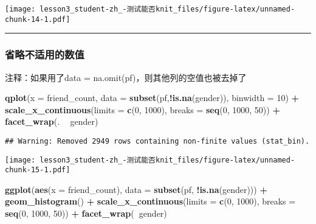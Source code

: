 \documentclass[]{article}
\newenvironment{Shaded}{\begin{snugshade}}{\end{snugshade}}
\newcommand{\DataTypeTok}[1]{\textcolor[rgb]{0.13,0.29,0.53}{#1}}
\newcommand{\DecValTok}[1]{\textcolor[rgb]{0.00,0.00,0.81}{#1}}
\newcommand{\KeywordTok}[1]{\textcolor[rgb]{0.13,0.29,0.53}{\textbf{#1}}}
\newcommand{\NormalTok}[1]{#1}
\newcommand{\OperatorTok}[1]{\textcolor[rgb]{0.81,0.36,0.00}{\textbf{#1}}}
\newcommand{\StringTok}[1]{\textcolor[rgb]{0.31,0.60,0.02}{#1}}
\begin{document}
\texttt{[image: lesson3\_student-zh\_-测试能否knit\_files/figure-latex/unnamed-chunk-14-1.pdf]}

\begin{center}\rule{0.5\linewidth}{\linethickness}\end{center}

\subsubsection{省略不适用的数值}

注释：如果用了data = na.omit(pf)，则其他列的空值也被去掉了

\begin{Shaded}
\begin{Highlighting}[]
\KeywordTok{qplot}\NormalTok{(}\DataTypeTok{x =}\NormalTok{ friend_count, }\DataTypeTok{data =} \KeywordTok{subset}\NormalTok{(pf,}\OperatorTok{!}\KeywordTok{is.na}\NormalTok{(gender)), }\DataTypeTok{binwidth =} \DecValTok{10}\NormalTok{) }\OperatorTok{+}
\StringTok{  }\KeywordTok{scale_x_continuous}\NormalTok{(}\DataTypeTok{limits =} \KeywordTok{c}\NormalTok{(}\DecValTok{0}\NormalTok{, }\DecValTok{1000}\NormalTok{), }\DataTypeTok{breaks =} \KeywordTok{seq}\NormalTok{(}\DecValTok{0}\NormalTok{, }\DecValTok{1000}\NormalTok{, }\DecValTok{50}\NormalTok{)) }\OperatorTok{+}
\StringTok{  }\KeywordTok{facet_wrap}\NormalTok{(. }\OperatorTok{~}\StringTok{ }\NormalTok{gender) }
\end{Highlighting}
\end{Shaded}

\begin{verbatim}
## Warning: Removed 2949 rows containing non-finite values (stat_bin).
\end{verbatim}

\texttt{[image: lesson3\_student-zh\_-测试能否knit\_files/figure-latex/unnamed-chunk-15-1.pdf]}

\begin{Shaded}
\begin{Highlighting}[]
\KeywordTok{ggplot}\NormalTok{(}\KeywordTok{aes}\NormalTok{(}\DataTypeTok{x =}\NormalTok{ friend_count), }\DataTypeTok{data =} \KeywordTok{subset}\NormalTok{(pf, }\OperatorTok{!}\KeywordTok{is.na}\NormalTok{(gender))) }\OperatorTok{+}\StringTok{ }
\StringTok{  }\KeywordTok{geom_histogram}\NormalTok{() }\OperatorTok{+}\StringTok{ }
\StringTok{  }\KeywordTok{scale_x_continuous}\NormalTok{(}\DataTypeTok{limits =} \KeywordTok{c}\NormalTok{(}\DecValTok{0}\NormalTok{, }\DecValTok{1000}\NormalTok{), }\DataTypeTok{breaks =} \KeywordTok{seq}\NormalTok{(}\DecValTok{0}\NormalTok{, }\DecValTok{1000}\NormalTok{, }\DecValTok{50}\NormalTok{)) }\OperatorTok{+}\StringTok{ }
\StringTok{  }\KeywordTok{facet_wrap}\NormalTok{(}\OperatorTok{~}\NormalTok{gender)}
\end{Highlighting}
\end{Shaded}
\end{document}
